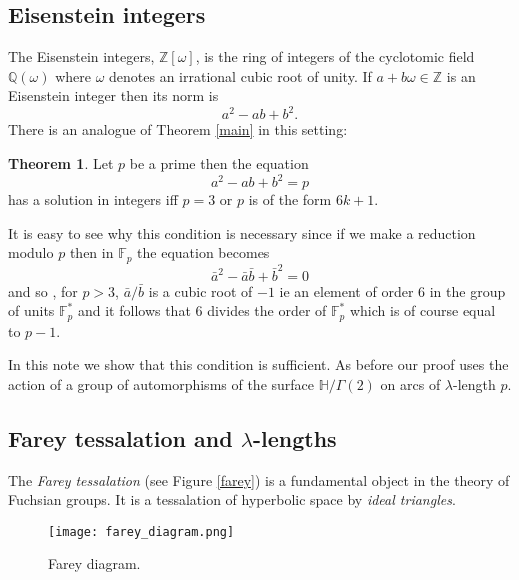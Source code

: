 \documentclass[12pt]{amsart}
\theoremstyle{plain}
\theoremstyle{definition}
\newtheorem{thm}{Theorem}[section]
\def\HH{\mathbb{H}}
\def\xx{\HH/g2}
\def\ZZ{\mathbb{Z}}
\def\QQ{\mathbb{Q}}
\def\fp{\mathbb{F}_p}
\def\g2{\Gamma(2)}
\def\xx{\HH/\g2}
\begin{document}
\subsection{Eisenstein integers}

The Eisenstein integers, $\ZZ[\omega]$,
is  the ring of integers of the cyclotomic field $\QQ(\omega)$
where $\omega$ denotes  an irrational cubic root of unity.
If $a + b\omega \in \ZZ$ is  an Eisenstein integer then its norm is
$$a^2 - ab  + b^2.$$
There is an analogue of Theorem \ref{main} in this setting:

\begin{thm}\label{eisenstein}
Let $p$ be a prime then the equation
\begin{equation}\label{eisenstein norm}
a^2 - ab + b^2 = p 
\end{equation}
has a solution in integers  iff  $p =3$ or $p$ is of the form $6k + 1$.
\end{thm}

It is easy to see why this condition is necessary since 
if we make a reduction modulo $p$ then  in $\fp$
the  equation  becomes
$$\bar{a}^2 -  \bar{a}\bar{b} +\bar{ b}^2 = 0$$
and so , for $p> 3$,  $\bar{a}/\bar{b}$ is a
cubic root of $-1$ ie an element of order 6 in the group of units
$\fp^*$
and it follows that 6 divides 
the order of $\fp^*$  
which is of course equal to $p-1$.

In this note we show that this  condition is sufficient.
As before our  proof uses the action  
of a group of automorphisms of  the surface $\xx$ on
arcs of $\lambda$-length $p$.


\subsection{Farey tessalation and $\lambda$-lengths}

The  \textit{Farey tessalation} (see Figure \ref{farey}) is a fundamental object in the theory of Fuchsian groups. It is a tessalation of hyperbolic space by \textit{ideal triangles}.

\begin{figure}[hb]
\begin{center}
\texttt{[image: farey\_diagram.png]} 
\end{center}
\caption{Farey diagram.}
\label{farey diagram}
\end{figure}
\end{document}
